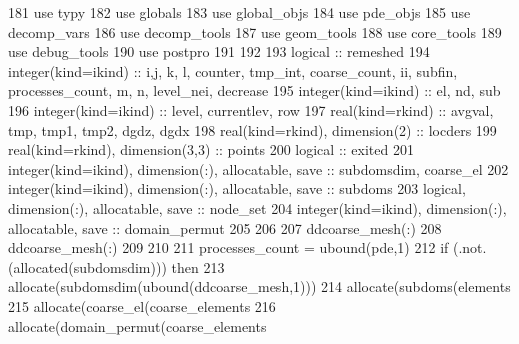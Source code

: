 \begin{DoxyCode}
181       \textcolor{keywordtype}{use }typy
182       \textcolor{keywordtype}{use }globals
183       \textcolor{keywordtype}{use }global_objs
184       \textcolor{keywordtype}{use }pde_objs
185       \textcolor{keywordtype}{use }decomp_vars
186       \textcolor{keywordtype}{use }decomp_tools
187       \textcolor{keywordtype}{use }geom_tools
188       \textcolor{keywordtype}{use }core_tools
189       \textcolor{keywordtype}{use }debug_tools
190       \textcolor{keywordtype}{use }postpro
191 
192 
193       \textcolor{keywordtype}{logical} :: remeshed
194       \textcolor{keywordtype}{integer(kind=ikind)} :: i,j, k, l, counter, tmp\_int, coarse\_count, ii\textcolor{comment}{, subfin, processes\_count, m, n, 
      level\_nei, decrease}
195 \textcolor{comment}{      }\textcolor{keywordtype}{integer(kind=ikind)} :: el, nd, sub
196       \textcolor{keywordtype}{integer(kind=ikind)} :: level, currentlev, row
197       \textcolor{keywordtype}{real(kind=rkind)}    :: avgval, tmp, tmp1, tmp2, dgdz, dgdx
198       \textcolor{keywordtype}{real(kind=rkind)}, \textcolor{keywordtype}{dimension(2)} :: locders
199       \textcolor{keywordtype}{real(kind=rkind)}, \textcolor{keywordtype}{dimension(3,3)} :: points
200       \textcolor{keywordtype}{logical} :: exited
201       \textcolor{keywordtype}{integer(kind=ikind)}, \textcolor{keywordtype}{dimension(:)}, \textcolor{keywordtype}{allocatable}, \textcolor{keywordtype}{save} :: subdomsdim\textcolor{comment}{, coarse\_el}
202 \textcolor{comment}{      }\textcolor{keywordtype}{integer(kind=ikind)}, \textcolor{keywordtype}{dimension(:)}, \textcolor{keywordtype}{allocatable}, \textcolor{keywordtype}{save} :: subdoms
203       \textcolor{keywordtype}{logical}, \textcolor{keywordtype}{dimension(:)}, \textcolor{keywordtype}{allocatable}, \textcolor{keywordtype}{save} :: node\_set
204       \textcolor{keywordtype}{integer(kind=ikind)}, \textcolor{keywordtype}{dimension(:)}, \textcolor{keywordtype}{allocatable}, \textcolor{keywordtype}{save} :: domain\_permut
205       
206 
207       ddcoarse_mesh(:)%
208       ddcoarse_mesh(:)%
209       
210 
211       processes\_count = ubound(pde,1)
212       \textcolor{keywordflow}{if} (.not.(\textcolor{keyword}{allocated}(subdomsdim))) \textcolor{keywordflow}{then}
213         \textcolor{keyword}{allocate}(subdomsdim(ubound(ddcoarse_mesh,1)))
214         \textcolor{keyword}{allocate}(subdoms(elements%
215         \textcolor{keyword}{allocate}(coarse\_el(coarse_elements%
216         \textcolor{keyword}{allocate}(domain\_permut(coarse_elements%

\end{DoxyCode}
